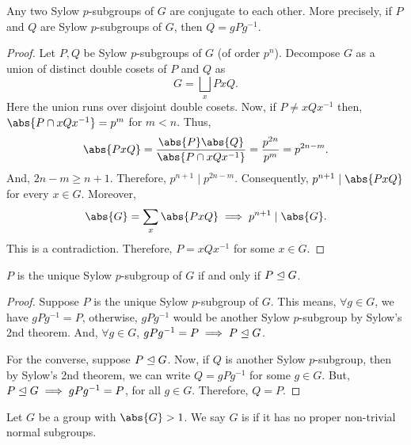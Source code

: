 \documentclass[11pt]{penrose}
\begin{document}
\begin{nthm}
    Any two Sylow $p$-subgroups of $G$ are conjugate to each other. More precisely, if $P$ and $Q$ are Sylow $p$-subgroups of $G$, then $Q = gPg^{-1}$.
\end{nthm}
\begin{proof}
    Let $P, Q$ be Sylow $p$-subgroups of $G$ (of order $p^{n}$). Decompose $G$ as a union of distinct double cosets of $P$ and $Q$ as
    \begin{equation*}
        G = \bigsqcup_{x} PxQ.
    \end{equation*}
    Here the union runs over disjoint double cosets. Now, if $P \neq xQx^{-1}$ then, $\abs{P \cap x Q x^{-1}} = p^{m}$ for $m < n$. Thus,
    \begin{equation*}
        \abs{PxQ}
        = \frac{\abs{P}\abs{Q}}{\abs{P \cap x Q x^{-1}}}
        = \frac{p^{2n}}{p^{m}}
        = p^{2n-m}.
    \end{equation*}
    And, $2n-m \geq n+1$. Therefore, $p^{n+1} \mid p^{2n-m}$. Consequently, $p^{n+1} \mid \abs{PxQ}$ for every $x \in G$. Moreover,
    \begin{equation*}
        \abs{G} = \sum_{x} \abs{PxQ}
        \implies
        p^{n+1} \mid \abs{G}.
    \end{equation*}
    This is a contradiction. Therefore, $P = xQx^{-1}$ for some $x \in G$.
\end{proof}

\begin{ncor}
    $P$ is the unique Sylow $p$-subgroup of $G$ if and only if $P \mathrel{\trianglelefteq} G$.
\end{ncor}
\begin{proof}
    Suppose $P$ is the unique Sylow $p$-subgroup of $G$. This means, $\forall g \in G$, we have $gPg^{-1} = P$, otherwise, $gPg^{-1}$ would be another Sylow $p$-subgroup by Sylow's 2nd theorem. And, $\forall g \in G$, $gPg^{-1} = P \implies P \mathrel{\trianglelefteq} G$.

    For the converse, suppose $P \mathrel{\trianglelefteq} G$. Now, if $Q$ is another Sylow $p$-subgroup, then by Sylow's 2nd theorem, we can write $Q = gPg^{-1}$ for some $g \in G$. But, $P \mathrel{\trianglelefteq} G \implies gPg^{-1} = P$, for all $g \in G$. Therefore, $Q = P$.
\end{proof}

\begin{ndfn}
    Let $G$ be a group with $\abs{G} > 1$. We say $G$ is  if it has no proper non-trivial normal subgroups.
\end{ndfn}
\end{document}
